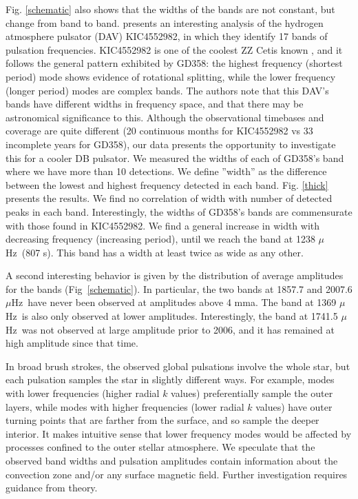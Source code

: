 \documentclass[12pt,preprint]{aastex}
\newcommand{\muHz}{\mbox{$\mu$Hz}}
\begin{document}
Fig. \ref{schematic} also shows that the widths of the bands are not constant, but change 
from band to band. \citet{Bell15} presents an interesting analysis of the hydrogen atmosphere pulsator 
(DAV) KIC4552982, in which they identify 17 bands of pulsation frequencies. KIC4552982 is one of the 
coolest ZZ Cetis known \citep{Tremblay2013}, and it follows the general pattern exhibited 
by GD358: the highest frequency (shortest period) mode shows evidence of rotational splitting, while the 
lower frequency (longer period) modes are complex bands. The authors note that this DAV's bands have 
different widths in frequency space, and that there may be astronomical significance to this. 
Although the observational timebases and coverage are quite different (20 continuous months 
for KIC4552982 vs 33 incomplete years for GD358), our data presents the opportunity to investigate this 
for a cooler DB pulsator.  We measured the widths of each of GD358's band where we have
more than 10 detections. We define ''width'' as the difference between the lowest and highest frequency 
detected in each band. Fig. \ref{thick} presents the results. We find no correlation of width with number
of detected peaks in each band. Interestingly, the widths of GD358's bands are commensurate with those 
found in KIC4552982. We find a general increase in width with decreasing frequency (increasing period), 
until we reach the band at 1238 \muHz\ (807 s). This band has a width at least twice as wide as any other. 

A second interesting behavior is given by the distribution of average amplitudes for the bands 
(Fig~\ref{schematic}). In particular, the two bands at 1857.7 and 2007.6  \muHz\ have never been observed 
at amplitudes above 4 mma. The band at 1369 \muHz\ is also only observed at lower amplitudes. Interestingly, 
the band at 1741.5 \muHz\ was not observed at large amplitude prior to 2006, and it has remained at high 
amplitude since that time. 

In broad brush strokes, the observed global pulsations involve the whole star, but each pulsation samples the star
in slightly different ways.  For example, modes with lower frequencies (higher radial $k$ values) preferentially 
sample the outer layers, while modes with higher frequencies (lower radial $k$ values) have outer turning points 
that are farther from the surface, and so sample the deeper interior. It makes intuitive sense that lower 
frequency modes would be affected by processes confined to the outer stellar atmosphere. We speculate that the 
observed band widths and pulsation amplitudes contain information about the convection zone and/or any surface
magnetic field. Further investigation requires guidance from theory.  
\end{document}

